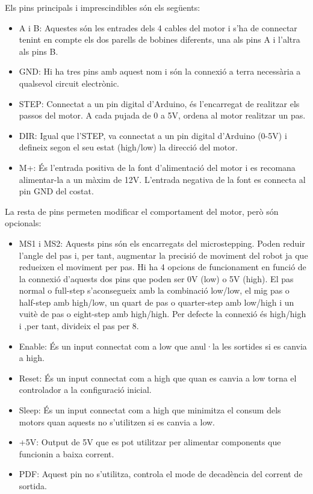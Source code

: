 Els pins principals i imprescindibles són els següents:


\begin{itemize}
	
	\item	A i B: Aquestes són les entrades dels 4 cables del motor i s'ha de connectar tenint en compte els dos parells de bobines diferents, una als pins A i l'altra als pins B. 
	
	\item GND: Hi ha tres pins amb aquest nom i són la connexió a terra necessària a qualsevol circuit electrònic.
	
	\item STEP: Connectat a un pin digital d'Arduino, és l'encarregat de realitzar els passos del motor. A cada pujada de 0 a 5V, ordena al motor realitzar un pas. 
	
	\item DIR: Igual que l'STEP, va connectat a un pin digital d'Arduino (0-5V) i defineix segon el seu estat (high/low) la direcció del motor.
	
	\item M+: És l'entrada positiva de la font d'alimentació del motor i es recomana alimentar-la a un màxim de 12V. L'entrada negativa de la font es connecta al pin GND del costat.
	
\end{itemize}

La resta de pins permeten modificar el comportament del motor, però són opcionals:

\begin{itemize}
	
	\item MS1 i MS2: Aquests pins són els encarregats del microstepping. Poden reduir l'angle del pas i, per tant, augmentar la precisió de moviment del robot ja que redueixen el moviment per pas. Hi ha 4 opcions de funcionament en funció de la connexió d'aquests dos pins que poden ser 0V (low) o 5V (high). El pas normal o full-step s'aconsegueix amb la combinació low/low, el mig pas o half-step amb high/low, un quart de pas o quarter-step amb low/high i un vuitè de pas o eight-step amb high/high. Per defecte la connexió és high/high i ,per tant, divideix el pas per 8. 
	
	\item Enable: És un input connectat com a low que anul·la les sortides si es canvia a high.
	
	\item Reset: És un input connectat com a high que quan es canvia a low torna el controlador a la configuració inicial. 
	
	\item Sleep: És un input connectat com a high que minimitza el consum dels motors quan aquests no s'utilitzen si es canvia a low.
	
	\item +5V: Output de 5V que es pot utilitzar per alimentar components que funcionin a baixa corrent. 
	
	\item PDF: Aquest pin no s'utilitza, controla el mode de decadència del corrent de sortida.
	
\end{itemize}


